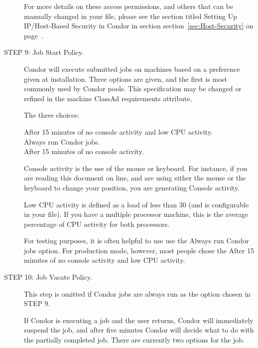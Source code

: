 \begin{description}
	 For more details on these access permissions, and others that can be
	 manually changed in your  file, please
	 see the section titled Setting Up IP/Host-Based Security in Condor
	 in section
	 section~\ref{sec:Host-Security}
	 on page~\pageref{sec:Host-Security}.

\item[STEP 9: Job Start Policy.]
     Condor will execute submitted jobs on machines based on
     a preference given at installation.
     Three options are given, and the first is most commonly used
     by Condor pools.
     This specification may be changed or refined in
     the machine ClassAd requirements attribute.

     The three choices:
     \begin{description}
     \item[After 15 minutes of no console activity and low CPU activity.]
     \item[Always run Condor jobs.]
     \item[After 15 minutes of no console activity.]
     \end{description}

     Console activity is the use of the mouse or keyboard.  For instance,
	 if you are reading this document on line, and are using either the
	 mouse or the keyboard to change your position, you are generating
	 Console activity.

     Low CPU activity is defined as a load of less than 30\Percent
	 (and is configurable in your  file).  If you have
	 a multiple processor machine, this is the average percentage of
	 CPU activity for both processors.

	For testing purposes, it is often helpful to use use the Always run Condor
	jobs option.  For production mode, however, most people chose the
	After 15 minutes of no console activity and low CPU activity.

\item[STEP 10: Job Vacate Policy.]
     This step is omitted if Condor jobs are always run as
     the option chosen in STEP 9.

     If Condor is executing a job and the user returns,
	 Condor will immediately suspend the job, and after five minutes
	 Condor will decide what to do with the partially completed job.
     There are currently two options for the job.


\end{description}
